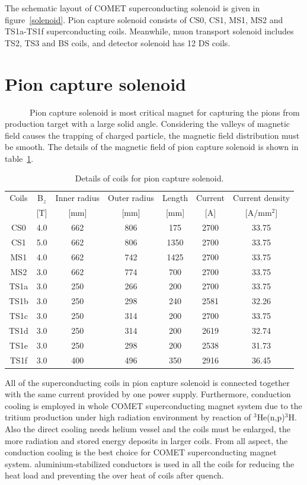 The schematic layout of COMET superconducting solenoid is given in figure~\ref{solenoid}.
Pion capture solenoid consists of CS0, CS1, MS1, MS2 and TS1a-TS1f superconducting coils.
Meanwhile, muon transport solenoid includes TS2, TS3 and BS coils, and detector solenoid has 12 DS coils.

 \section{Pion capture solenoid}
~~~~~~Pion capture solenoid is most critical magnet for capturing the pions from production target with a large solid angle.
Considering the valleys of magnetic field causes the trapping of charged particle, the magnetic field distribution must be smooth.
The details of the magnetic field of pion capture solenoid is shown in table~\ref{magfldcs}.
\begin{table}[H]
 \centering
 \begin{tabular}{ccccccc} \hline \hline
  Coils & B$_z$ & Inner radius & Outer radius & Length & Current & Current density \\
   & [T] & [mm] & [mm] & [mm] & [A] & [A/mm$^2$] \\ \hline
  CS0 & 4.0 & 662 & 806 & 175 & 2700 & 33.75 \\
  CS1 & 5.0 & 662 & 806 & 1350 & 2700 & 33.75 \\
  MS1 & 4.0 & 662 & 742 & 1425 & 2700 & 33.75 \\
  MS2 & 3.0 & 662 & 774 & 700 & 2700 & 33.75 \\
  TS1a & 3.0 & 250 & 266 & 200 & 2700 & 33.75 \\
  TS1b & 3.0 & 250 & 298 & 240 & 2581 & 32.26 \\
  TS1c & 3.0 & 250 & 314 & 200 & 2700 & 33.75 \\
  TS1d & 3.0 & 250 & 314 & 200 & 2619 & 32.74 \\
  TS1e & 3.0 & 250 & 298 & 200 & 2538 & 31.73 \\
  TS1f & 3.0 & 400 & 496 & 350 & 2916 & 36.45 \\ \hline \hline
 \end{tabular}
 \caption{Details of coils for pion capture solenoid.}
 \label{magfldcs}
\end{table}
All of the superconducting coils in pion capture solenoid is connected together with the same current provided by one power supply.
Furthermore, conduction cooling is employed in whole COMET superconducting magnet system due to the tritium production under high radiation environment by reaction of $^3$He(n,p)$^3$H.
Also the direct cooling needs helium vessel and the coils must be enlarged, the more radiation and stored energy deposits in larger coils.
From all aspect, the conduction cooling is the best choice for COMET superconducting magnet system.
aluminium-stabilized conductors is used in all the coils for reducing the heat load and preventing the over heat of coils after quench.


